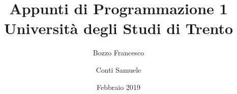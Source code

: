 \documentclass[a4paper,12pt]{book}
\begin{document}
\author{Bozzo Francesco \and Conti Samuele}
\title{Appunti di Programmazione 1\\Università degli Studi di Trento}
\date{Febbraio 2019}

\frontmatter
\maketitle
\tableofcontents

\mainmatter















\backmatter
\end{document}
